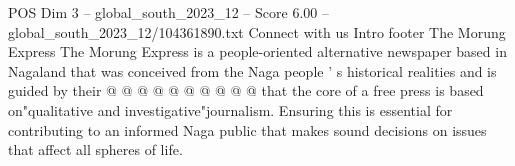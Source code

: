 \begin{textsample}{POS Dim 3 – global\_south\_2023\_12 – Score 6.00 – global\_south\_2023\_12/104361890.txt}
Connect with us Intro footer The Morung Express The Morung Express is a people-oriented alternative newspaper based in Nagaland that was conceived from the Naga people ' s historical realities and is guided by their @ @ @ @ @ @ @ @ @ @ that the core of a free press is based on"qualitative and investigative"journalism.
Ensuring this is essential for contributing to an informed Naga public that makes sound decisions on issues that affect all spheres of life.

\end{textsample}
